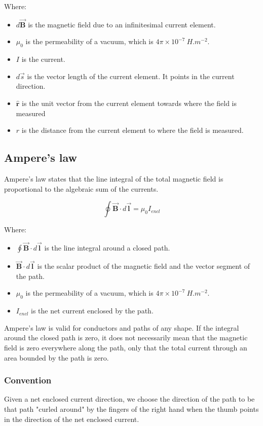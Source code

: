 \documentclass[11pt]{article}
\begin{document}
Where:
\begin{itemize}
\item \(d \vec{\boldsymbol{B}}\) is the magnetic field due to an infinitesimal current element.
\item \(\mu_0\) is the permeability of a vacuum, which is \(4 \pi \times 10^{-7} \ \unit{H.m^{-2}}\).
\item \(I\) is the current.
\item \(d \vec{s}\) is the vector length of the current element. It points in the current direction.
\item \(\hat{\boldsymbol{r}}\) is the unit vector from the current element towards where the field is measured
\item \(r\) is the distance from the current element to where the field is measured.
\end{itemize}

\newpage
\subsection{Ampere's law}
\label{sec:orgeba0019}
Ampere's law states that the line integral of the total magnetic field is proportional to the algebraic sum of the currents.

\[\oint \vec{\boldsymbol{B}} \cdot d \vec{\boldsymbol{l}} = \mu_0 I_{encl}\]

Where:
\begin{itemize}
\item \(\oint \vec{\boldsymbol{B}} \cdot d \vec{\boldsymbol{l}}\) is the line integral around a closed path.
\item \(\vec{\boldsymbol{B}} \cdot d \vec{\boldsymbol{l}}\) is the scalar product of the magnetic field and the vector segment of the path.
\item \(\mu_0\) is the permeability of a vacuum, which is \(4 \pi \times 10^{-7} \ \unit{H.m^{-2}}\).
\item \(I_{encl}\) is the net current enclosed by the path.
\end{itemize}

Ampere's law is valid for conductors and paths of any shape. If the integral around the closed path is zero, it does not necessarily mean that the magnetic field is zero everywhere along the path, only that the total current through an area bounded by the path is zero.
\subsubsection{Convention}
\label{sec:orga3ecb7f}
Given a net enclosed current direction, we choose the direction of the path to be that path "curled around" by the fingers of the right hand when the thumb points in the direction of the net enclosed current.
\end{document}
